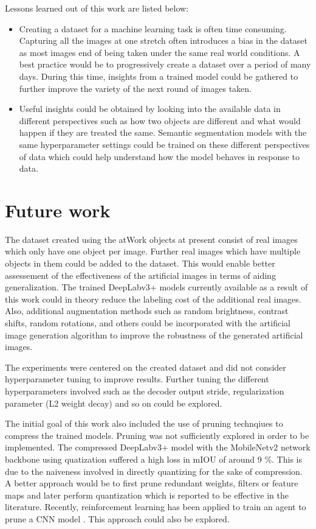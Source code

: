 Lessons learned out of this work are listed below:
	\begin{itemize}
		\item Creating a dataset for a machine learning task is often time consuming. Capturing all the images at one stretch often introduces a bias in the dataset as most images end of being taken under the same real world conditions. A best practice would be to progressively create a dataset over a period of many days. During this time, insights from a trained model could be gathered to further improve the variety of the next round of images taken.
		\item Useful insights could be obtained by looking into the available data in different perspectives such as how two objects are different and what would happen if they are treated the same. Semantic segmentation models with the same hyperparameter settings could be trained on these different perspectives of data which could help understand how the model behaves in response to data.
	\end{itemize}

\section{Future work}

The dataset created using the atWork objects at present consist of real images which only have one object per image. Further real images which have multiple objects in them could be added to the dataset. This would enable better assessement of the effectiveness of the artificial images in terms of aiding generalization. The trained DeepLabv3+ models currently available as a result of this work could in theory reduce the labeling cost of the additional real images. Also, additional augmentation methods such as random brightness, contrast shifts, random rotations, and others could be incorporated with the artificial image generation algorithm to improve the robustness of the generated artificial images.

The experiments were centered on the created dataset and did not consider hyperparameter tuning to improve results. Further tuning the different hyperparameters involved such as the decoder output stride, regularization parameter (L2 weight decay) and so on could be explored.

The initial goal of this work also included the use of pruning technqiues to compress the trained models. Pruning was not sufficiently explored in order to be implemented. The compressed DeepLabv3+ model with the MobileNetv2 network backbone using quatization suffered a high loss in mIOU of around 9 \%. This is due to the naiveness involved in directly quantizing for the sake of compression. A better approach would be to first prune redundant weights, filters or feature maps and later perform quantization which is reported to be effective in the literature. Recently, reinforcement learning has been applied to train an agent to prune a CNN model \cite{DBLP:journals/corr/abs-1801-07365}. This approach could also be explored.

